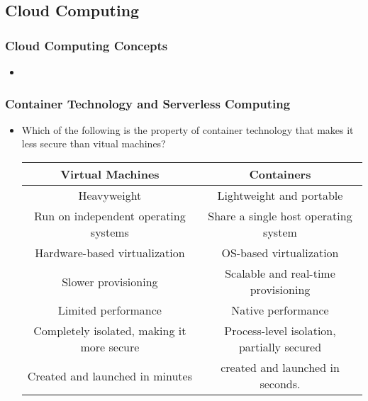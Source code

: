 \subsection{Cloud Computing}
\subsubsection{Cloud Computing Concepts}
\begin{itemize}
    \item 
\end{itemize}
\subsubsection{Container Technology and Serverless Computing}
\begin{itemize}
    \item Which of the following is the property of container technology that makes it less secure than vitual machines?
    \begin{tabular}[H]{|c|c|}
        \hline
        Virtual Machines & Containers\\
        \hline
        Heavyweight & Lightweight and portable\\
        \hline
        Run on independent operating systems & Share a single host operating system\\
        \hline
        Hardware-based virtualization & OS-based virtualization\\
        \hline
        Slower provisioning & Scalable and real-time provisioning\\
        \hline
        Limited performance & Native performance\\
        \hline 
        Completely isolated, making it more secure & Process-level isolation, partially secured\\
        \hline
        Created and launched in minutes & created and launched in seconds.\\
        \hline
    \end{tabular}
\end{itemize}
